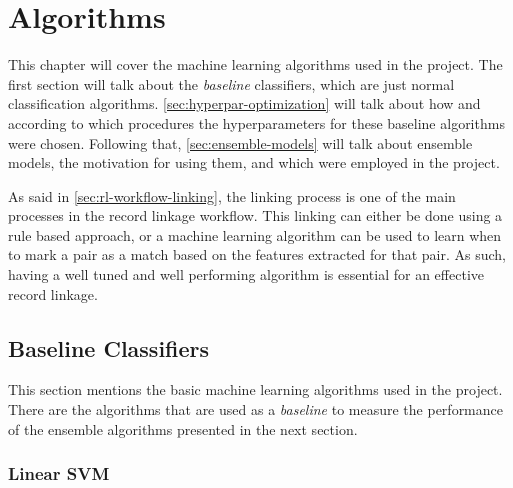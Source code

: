 \documentclass[epsfig,a4paper,11pt,titlepage,twoside,openany]{book}
\begin{document}



\chapter{Algorithms}
\label{chap:algorithms}

This chapter will cover the machine learning algorithms used in the project. The first section will talk about the \textit{baseline} classifiers, which are just normal classification algorithms. \autoref{sec:hyperpar-optimization} will talk about how and according to which procedures the hyperparameters for these baseline algorithms were chosen. Following that, \autoref{sec:ensemble-models} will talk about ensemble models, the motivation for using them, and which were employed in the project.

As said in \autoref{sec:rl-workflow-linking}, the linking process is one of the main processes in the record linkage workflow. This linking can either be done using a rule based approach, or a machine learning algorithm can be used to learn when to mark a pair as a match based on the features extracted for that pair. As such, having a well tuned and well performing algorithm is essential for an effective record linkage.


\section{Baseline Classifiers}
\label{sec:baseline-classifiers}

This section mentions the basic machine learning algorithms used in the project. There are the algorithms that are used as a \textit{baseline} to measure the performance of the ensemble algorithms presented in the next section. 




\subsection{Linear SVM}
\label{sec:clf-lsvm}
\end{document}
